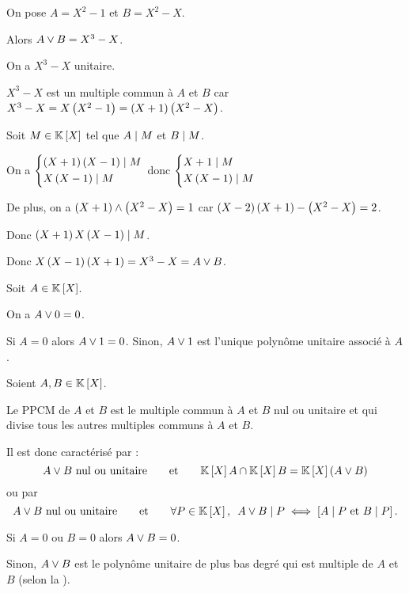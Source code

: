 \begin{ex}
On pose \(A=X^2-1\) et \(B=X^2-X\).

Alors \(A\lor B=X^3-X\).
\end{ex}

\begin{dem}
On a \(X^3-X\) unitaire.

\(X^3-X\) est un multiple commun à \(A\) et \(B\) car \(X^3-X=X\left(X^2-1\right)=\left(X+1\right)\left(X^2-X\right)\).

Soit \(M\in\poly\) tel que \(A\mid M\) et \(B\mid M\).

On a \(\begin{dcases}\left(X+1\right)\left(X-1\right)\mid M \\ X\left(X-1\right)\mid M\end{dcases}\) donc \(\begin{dcases}X+1\mid M \\ X\left(X-1\right)\mid M\end{dcases}\)

De plus, on a \(\left(X+1\right)\land\left(X^2-X\right)=1\) car \(\left(X-2\right)\left(X+1\right)-\left(X^2-X\right)=2\).

Donc \(\left(X+1\right)X\left(X-1\right)\mid M\).

Donc \(X\left(X-1\right)\left(X+1\right)=X^3-X=A\lor B\).
\end{dem}

\begin{rem}
Soit \(A\in\poly\).

On a \(A\lor0=0\).

Si \(A=0\) alors \(A\lor1=0\). Sinon, \(A\lor1\) est l'unique polynôme unitaire associé à \(A\).
\end{rem}

\begin{rem}
Soient \(A,B\in\poly\).

Le PPCM de \(A\) et \(B\) est le multiple commun à \(A\) et \(B\) nul ou unitaire et qui divise tous les autres multiples communs à \(A\) et \(B\).

Il est donc caractérisé par : \[A\ou B\text{ nul ou unitaire}\qquad\text{et}\qquad\poly A\inter\poly B=\poly\paren{A\ou B}\] ou par \[A\ou B\text{ nul ou unitaire}\qquad\text{et}\qquad\quantifs{\forall P\in\poly}A\ou B\divise P\ssi\croch{A\divise P\text{ et }B\divise P}.\]

Si \(A=0\) ou \(B=0\) alors \(A\lor B=0\).

Sinon, \(A\lor B\) est le polynôme unitaire de plus bas degré qui est multiple de \(A\) et \(B\) (selon la ).
\end{rem}

